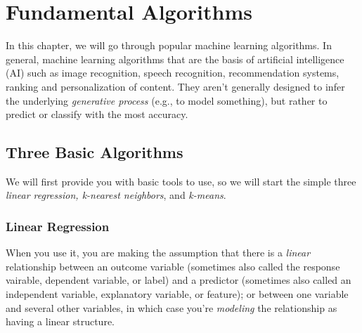 \chapter{Fundamental Algorithms}
In this chapter, we will go through popular machine learning algorithms. In general, machine learning algorithms that are the basis of artificial intelligence (AI) such as image recognition, speech recognition, recommendation systems, ranking and personalization of content. They aren't generally designed to infer the underlying \textit{generative process} (e.g., to model something), but rather to predict or classify with the most accuracy.

\section{Three Basic Algorithms}
We will first provide you with basic tools to use, so we will start the simple three \textit{linear regression, k-nearest neighbors}, and \textit{k-means}.

\subsection{Linear Regression}
When you use it, you are making the assumption that there is a \textit{linear} relationship between an outcome variable (sometimes also called the response vairable, dependent variable, or label) and a predictor (sometimes also called an independent variable, explanatory variable, or feature); or between one variable and several other variables, in which case you're \textit{modeling} the relationship as having a linear structure.